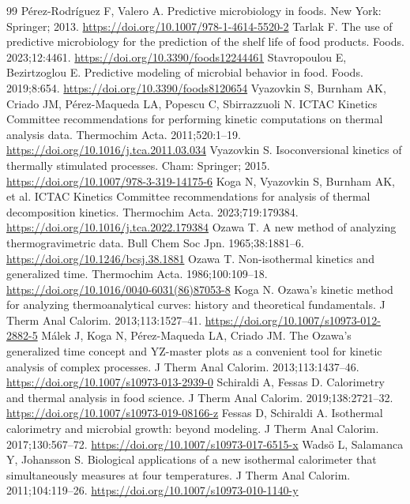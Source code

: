 {\scriptsize\linespread{0.9}\selectfont
\makeatletter\renewcommand{}\makeatother
\begin{thebibliography}{99}
\setlength{\itemsep}{-0.4pt}
 Pérez-Rodríguez F, Valero A. Predictive microbiology in foods. New York: Springer; 2013. \url{https://doi.org/10.1007/978-1-4614-5520-2}
 Tarlak F. The use of predictive microbiology for the prediction of the shelf life of food products. Foods. 2023;12:4461. \url{https://doi.org/10.3390/foods12244461}
 Stavropoulou E, Bezirtzoglou E. Predictive modeling of microbial behavior in food. Foods. 2019;8:654. \url{https://doi.org/10.3390/foods8120654}
 Vyazovkin S, Burnham AK, Criado JM, Pérez-Maqueda LA, Popescu C, Sbirrazzuoli N. ICTAC Kinetics Committee recommendations for performing kinetic computations on thermal analysis data. Thermochim Acta. 2011;520:1--19. \url{https://doi.org/10.1016/j.tca.2011.03.034}
 Vyazovkin S. Isoconversional kinetics of thermally stimulated processes. Cham: Springer; 2015. \url{https://doi.org/10.1007/978-3-319-14175-6}
 Koga N, Vyazovkin S, Burnham AK, et al. ICTAC Kinetics Committee recommendations for analysis of thermal decomposition kinetics. Thermochim Acta. 2023;719:179384. \url{https://doi.org/10.1016/j.tca.2022.179384}
 Ozawa T. A new method of analyzing thermogravimetric data. Bull Chem Soc Jpn. 1965;38:1881--6. \url{https://doi.org/10.1246/bcsj.38.1881}
 Ozawa T. Non-isothermal kinetics and generalized time. Thermochim Acta. 1986;100:109--18. \url{https://doi.org/10.1016/0040-6031(86)87053-8}
 Koga N. Ozawa's kinetic method for analyzing thermoanalytical curves: history and theoretical fundamentals. J Therm Anal Calorim. 2013;113:1527--41. \url{https://doi.org/10.1007/s10973-012-2882-5}
 Málek J, Koga N, Pérez-Maqueda LA, Criado JM. The Ozawa's generalized time concept and YZ-master plots as a convenient tool for kinetic analysis of complex processes. J Therm Anal Calorim. 2013;113:1437--46. \url{https://doi.org/10.1007/s10973-013-2939-0}
 Schiraldi A, Fessas D. Calorimetry and thermal analysis in food science. J Therm Anal Calorim. 2019;138:2721--32. \url{https://doi.org/10.1007/s10973-019-08166-z}
 Fessas D, Schiraldi A. Isothermal calorimetry and microbial growth: beyond modeling. J Therm Anal Calorim. 2017;130:567--72. \url{https://doi.org/10.1007/s10973-017-6515-x}
 Wadsö L, Salamanca Y, Johansson S. Biological applications of a new isothermal calorimeter that simultaneously measures at four temperatures. J Therm Anal Calorim. 2011;104:119--26. \url{https://doi.org/10.1007/s10973-010-1140-y}

\end{thebibliography}}
